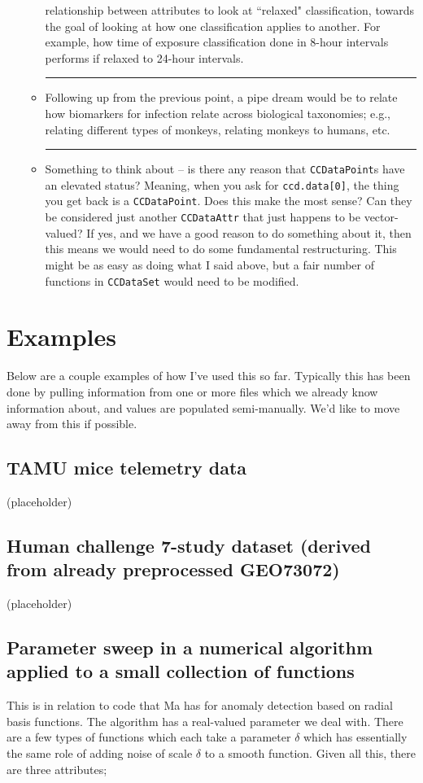 \documentclass{article}
\newcommand{\ttt}{\texttt}
\newcommand\crule[3][black]{\textcolor{#1}{\rule{#2}{#3}}}
\newcommand{\hardtask}{%
  \crule[red]{0.7em}{0.7em}\;%
}
\begin{document}
\begin{itemize}
\begin{itemize}
    relationship between attributes to look at ``relaxed" classification, towards
    the goal of looking at how one classification applies to another. For example,
    how time of exposure classification done in 8-hour intervals performs if
    relaxed to 24-hour intervals.
    \item \hardtask Following up from the previous point,
    a pipe dream would be to relate how biomarkers for infection relate across
    biological taxonomies; e.g., relating different types of monkeys, relating
    monkeys to humans, etc.
    \item \hardtask Something to think about -- is there any reason
    that \ttt{CCDataPoint}s have an elevated status? Meaning, when you ask for
    \ttt{ccd.data[0]}, the thing you get back is a \ttt{CCDataPoint}. Does this
    make the most sense? Can they be considered just another
    \ttt{CCDataAttr} that just happens to be vector-valued? If yes, and we have a good
    reason to do something about it, then this means we would need to do some
    fundamental restructuring. This might be as easy as doing what I said above,
    but a fair number of functions in \ttt{CCDataSet} would need to be modified.
  \end{itemize}
\end{itemize}

\section{Examples}
Below are a couple examples of how I've used this so far.
Typically this has been done by pulling information from one or more
files which we already know information about, and values are
populated semi-manually. We'd like to move away from this if possible.

\subsection{TAMU mice telemetry data}
(placeholder)

\subsection{Human challenge 7-study dataset (derived from already preprocessed GEO73072)}
(placeholder)

\subsection{Parameter sweep in a numerical algorithm applied to a small collection of functions}
This is in relation to code that Ma has for
anomaly detection based on radial basis functions.
The algorithm has a real-valued parameter we
deal with. There are a few types of functions
which each take a parameter $\delta$ which has
essentially the same role of adding noise of scale
$\delta$ to a smooth function. Given all this, there
are three attributes;
\end{document}
